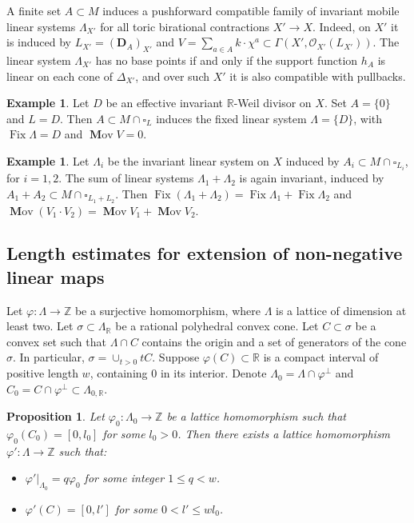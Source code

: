 \documentclass[12pt,twoside]{amsart}
\newcommand{\Z}{{\mathbb Z}}
\newcommand{\R}{{\mathbb R}}
\newcommand{\cO}{{\mathcal O}}
\newcommand{\bD}{{\mathbf D}}
\newcommand{\Fix}{\operatorname{Fix}}
\newcommand{\bMov}{\operatorname{{\mathbf Mov}}}
\theoremstyle{plain}
\newtheorem{prop}[thm]{Proposition}
\theoremstyle{definition}
\newtheorem{exmp}[thm]{Example}
\theoremstyle{remark}
\begin{document}
A finite set $A\subset M$ induces a pushforward compatible family of invariant mobile
linear systems $\Lambda_{X'}$ for all toric birational contractions $X'\to X$.
Indeed, on $X'$ it is induced by $L_{X'}=(\bD_A)_{X'}$ and 
$V=\sum_{a\in A}k\cdot \chi^a\subset \Gamma(X',\cO_{X'}(L_{X'}))$.
The linear system $\Lambda_{X'}$ has no base points if and only if the support function
$h_A$ is linear on each cone of $\Delta_{X'}$, and over such $X'$ it is also compatible
with pullbacks.

\begin{exmp}
Let $D$ be an effective invariant $\R$-Weil divisor on $X$. Set $A=\{0\}$ and $L=D$.
Then $A\subset M\cap \square_L$ induces the fixed linear system $\Lambda=\{D \}$,
with $\Fix \Lambda=D$ and $\bMov V=0$.
\end{exmp}

\begin{exmp}
	Let $\Lambda_i$ be the invariant linear system on $X$ induced by 
	$A_i\subset M\cap \square_{L_i}$, for $i=1,2$. The sum of linear systems
	$\Lambda_1+\Lambda_2$ is again invariant, induced by $A_1+A_2\subset M\cap \square_{L_1+L_2}$.
	Then $\Fix (\Lambda_1+\Lambda_2)=\Fix\Lambda_1+\Fix\Lambda_2$ and 
	$\bMov(V_1\cdot V_2)=\bMov V_1+\bMov V_2$. 
\end{exmp}


\subsection{Length estimates for extension of non-negative linear maps}

Let $\varphi\colon \Lambda\to \Z$ be a surjective homomorphism, where $\Lambda$
is a lattice of dimension at least two. Let $\sigma\subset \Lambda_\R$ be a rational polyhedral convex cone.
Let $C\subset \sigma$ be a convex set such that $\Lambda\cap C$ contains the origin and a set of generators of the cone $\sigma$. In particular, 
$
\sigma=\cup_{t>0}tC.
$
Suppose $\varphi(C)\subset \R$ is a compact interval of positive length $w$,
containing $0$ in its interior. 
Denote $\Lambda_0=\Lambda\cap \varphi^\perp$ and $C_0=C\cap \varphi^\perp\subset \Lambda_{0,\R}$.

\begin{prop}\label{extpofcn}
	Let $\varphi_0\colon \Lambda_0\to \Z$ be a lattice homomorphism such that
	$\varphi_0(C_0)=[0,l_0]$ for some $l_0>0$. Then there exists a lattice
	homomorphism $\varphi'\colon \Lambda\to \Z$ such that:
	\begin{itemize}
		\item $\varphi'|_{\Lambda_0}=q\varphi_0$ for some integer $1\le q< w$.
		\item $\varphi'(C)=[0,l']$ for some $0<l'\le wl_0$.
	\end{itemize}
\end{prop}
\end{document}

